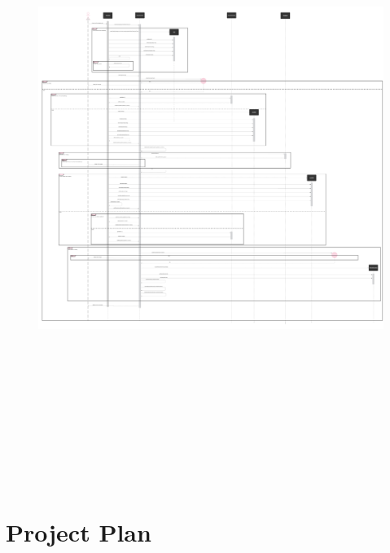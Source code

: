 \documentclass[]{article}
\begin{document}
\begin{figure}[H]
    \centering
    \includegraphics[height=8in]{./images/55.png}
\end{figure}

\hypertarget{project-plan-1}{%
    \section{Project Plan}\label{project-plan-1}}

\begin{figure}[H]
    \centering
\end{figure}
\end{document}
